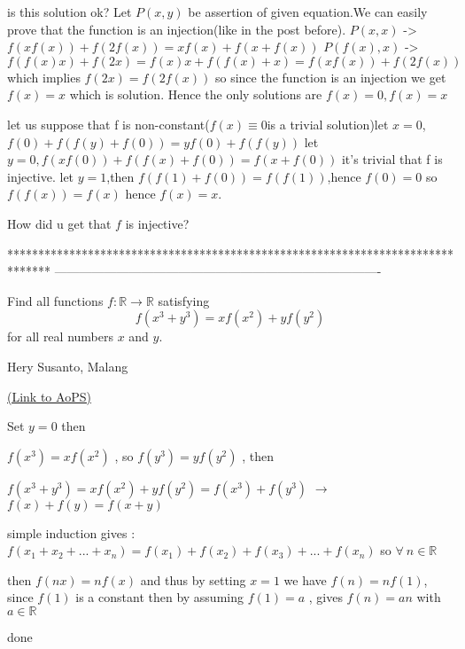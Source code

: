 \begin{solution}
	is this solution ok?
Let $P(x,y)$ be assertion of given equation.We can easily prove that the function is an injection(like in the post before).
$P(x,x)$ ->$f(xf(x))+f(2f(x))=xf(x)+f(x+f(x))$
$P(f(x),x)$ ->$f(f(x)x)+f(2x)=f(x)x+f(f(x)+x)=f(xf(x))+f(2f(x))$ which implies $f(2x)=f(2f(x))$ so since the function is an injection we get $f(x)=x$ which is solution.
Hence the only solutions are $f(x)=0,f(x)=x$
\end{solution}



\begin{solution}
	\begin{tcolorbox}let us suppose that f is non-constant($f(x)\equiv 0 $is a trivial solution)let $x=0$,$f(0)+f(f(y)+f(0))=yf(0)+f(f(y))$
let $y=0,f(xf(0))+f(f(x)+f(0))=f(x+f(0))$
it's trivial that f is injective.
let $y=1$,then $f(f(1)+f(0))=f(f(1))$,hence $f(0)=0$
so $f(f(x))=f(x)$ hence $f(x)=x$.\end{tcolorbox}

How did u get that $f$ is injective?
\end{solution}
*******************************************************************************
-------------------------------------------------------------------------------

\begin{problem}
	Find all functions $ f: \mathbb{R} \rightarrow \mathbb{R}$ satisfying \[ f(x^3+y^3)=xf(x^2)+yf(y^2)\] for all real numbers $ x$ and $ y$.
\begin{italicized}Hery Susanto, Malang\end{italicized}
	\flushright \href{https://artofproblemsolving.com/community/c6h311512}{(Link to AoPS)}
\end{problem}



\begin{solution}
	Set $ y=0$ then

$ f(x^3)=xf(x^2)$ , so $ f(y^3)=yf(y^2)$ , then

$ f(x^3+y^3)=xf(x^2)+yf(y^2)=f(x^3)+f(y^3)$ $ \rightarrow$ $ f(x)+f(y)=f(x+y)$

simple induction gives : $ f(x_1+x_2+...+x_n)=f(x_1)+f(x_2)+f(x_3)+...+f(x_n)$  so $ \forall \ n\in\mathbb{R}$ 

then $ f(nx)=nf(x)$ and thus by setting $ x=1$ we have $ f(n)=nf(1)$, since $ f(1)$ is a constant then by assuming $ f(1)=a$ , gives $ f(n)=an$ with $ a\in\mathbb{R}$ 

done
\end{solution}




